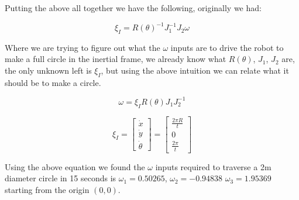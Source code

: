 \documentclass{article}
\begin{document}
Putting the above all together we have the following, originally we had:

\begin{equation}
    \xi_{I} = R(\theta)^{-1} J_{1}^{-1} J_{2} \omega
\end{equation}

Where we are trying to figure out what the $\omega$ inputs are to drive the 
robot to make a full circle in the inertial frame, we already know what 
$R(\theta)$, $J_{1}$, $J_{2}$ are, the only unknown left is $\xi_{I}$, but 
using the above intuition we can relate what it should be to make a circle.

\begin{equation}
    \omega = \xi_{I} R(\theta) J_{1} J_{2}^{-1}
\end{equation}

\begin{equation}
    \xi_{I} =
  		\begin{bmatrix}
            \dot{x} \\
            \dot{y} \\
            \dot{\theta}
        \end{bmatrix} 
        =
  		\begin{bmatrix}
            \frac{2 \pi R}{t} \\
            0 \\
            \frac{2 \pi}{t}
        \end{bmatrix}
\end{equation}

Using the above equation we found the $\omega$ inputs required to traverse a 
2m diameter circle in 15 seconds is $\omega_{1} = 0.50265$, $\omega_{2} = 
-0.94838$ $\omega_{3} = 1.95369$ starting from the origin $(0, 0)$.
\end{document}
